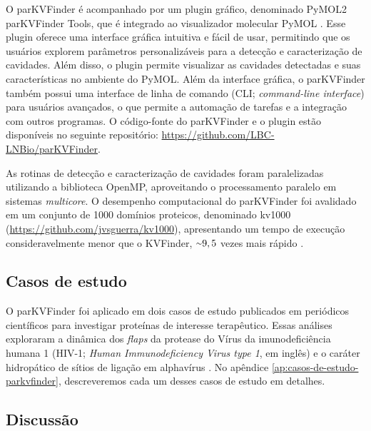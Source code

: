 \documentclass[Portugues]{phdquali}
\newcommand{\aproximadamente}{\raise.2ex\hbox{$\scriptstyle\sim$}}
\begin{document}
O parKVFinder é acompanhado por um plugin gráfico, denominado PyMOL2 parKVFinder Tools, que é integrado ao visualizador molecular PyMOL \cite{pymol}. Esse plugin oferece uma interface gráfica intuitiva e fácil de usar, permitindo que os usuários explorem parâmetros personalizáveis para a detecção e caracterização de cavidades. Além disso, o plugin permite visualizar as cavidades detectadas e suas características no ambiente do PyMOL. Além da interface gráfica, o parKVFinder também possui uma interface de linha de comando (CLI; \textit{command-line interface}) para usuários avançados, o que permite a automação de tarefas e a integração com outros programas. O código-fonte do parKVFinder e o plugin estão disponíveis no seguinte repositório: \url{https://github.com/LBC-LNBio/parKVFinder}.

As rotinas de detecção e caracterização de cavidades foram paralelizadas utilizando a biblioteca OpenMP, aproveitando o processamento paralelo em sistemas \textit{multicore}. O desempenho computacional do parKVFinder foi avalidado em um conjunto de 1000 domínios proteicos, denominado kv1000 (\url{https://github.com/jvsguerra/kv1000}), apresentando um tempo de execução consideravelmente menor que o KVFinder, $\aproximadamente9,5$ vezes mais rápido \cite{guerra2019,guerra2020}.


\subsection{Casos de estudo}

O parKVFinder foi aplicado em dois casos de estudo publicados em periódicos científicos para investigar proteínas de interesse terapêutico. Essas análises exploraram a dinâmica dos \textit{flaps} da protease do Vírus da imunodeficiência humana 1 (HIV-1; \textit{Human Immunodeficiency Virus type 1}, em inglês) \cite{guerra2020} e o caráter hidropático de sítios de ligação em alphavírus \cite{ribeiro2021}. No apêndice \ref{ap:casos-de-estudo-parkvfinder}, descreveremos cada um desses casos de estudo em detalhes.


\subsection{Discussão}
\end{document}
